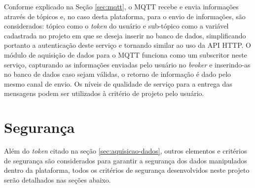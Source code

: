        \begin{figure}[!h]
    	\end{figure}
    	
    	Conforme explicado na Seção \ref{sec:mqtt}, o MQTT recebe e envia informações através de tópicos e, no caso desta plataforma, para o envio de informações, são considerados: tópico como o \textit{token} do usuário e sub-tópico como a variável cadastrada no projeto em que se deseja inserir no banco de dados, simplificando portanto a autenticação deste serviço e tornando similar ao uso da \gls{API} \gls{HTTP}. O módulo de aquisição de dados para o MQTT funciona como um subscritor neste serviço, capturando as informações enviadas pelo usuário no \textit{broker} e inserindo-as no banco de dados caso sejam válidas, o retorno de informação é dado pelo mesmo canal de envio. Os níveis de qualidade de serviço para a entrega das mensagens podem ser utilizados à critério de projeto pelo usuário.

\section{Segurança}
    \label{sec:seguranca}
    Além do \textit{token} citado na seção \ref{sec:aquisicao-dados}, outros elementos e critérios de segurança são considerados para garantir a segurança dos dados manipulados dentro da plataforma, todos os critérios de segurança desenvolvidos neste projeto serão detalhados nas seções abaixo.
        

